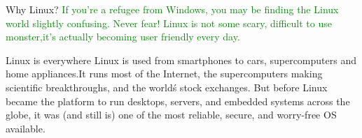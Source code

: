 \documentclass{beamer}
\begin{document}
{
\begin{frame}[t]{Why Linux?}\vspace{10pt}
\textcolor{green}{If you’re a refugee from Windows, you may be finding the Linux world slightly confusing. Never fear! Linux is not some scary, difficult to use monster,it’s actually becoming user friendly every day.}
\newline
\newline
\begin{block}{Linux is everywhere}
\vspace{0.5 em}
Linux is used from smartphones to cars, supercomputers and home appliances.It runs most of the Internet, the supercomputers making scientific breakthroughs, and the world\'s stock exchanges. But before Linux became the platform to run desktops, servers, and embedded systems across the globe, it was (and still is) one of the most reliable, secure, and worry-free OS available.
\end{block}
\end{frame}
}
\end{document}
